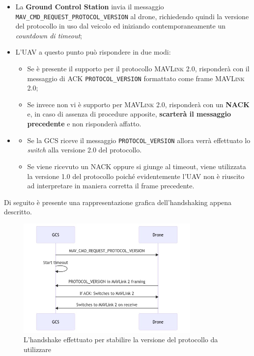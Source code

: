 \documentclass[a4paper, 12pt, oneside]{article}
\theoremstyle{definition}
\begin{document}
\begin{itemize}
    \item La \textbf{Ground Control Station} invia il messaggio \texttt{MAV\_CMD\_REQUEST\_PROTOCOL\_VERSION} al drone, richiedendo quindi la versione del protocollo in uso dal veicolo ed iniziando contemporaneamente un \textit{countdown di timeout};
    \item L'UAV a questo punto può rispondere in due modi: \begin{itemize}
        \item Se è presente il supporto per il protocollo \textsc{MAVLink} 2.0, risponderà con il messaggio di ACK \texttt{PROTOCOL\_VERSION} formattato come frame \textsc{MAVLink} 2.0;
        \item Se invece non vi è supporto per \textsc{MAVLink} 2.0, risponderà con un \textbf{NACK} e, in caso di assenza di procedure apposite, \textbf{scarterà il messaggio precedente} e non risponderà affatto.
    \end{itemize}
    \item \begin{itemize}
        \item Se la GCS riceve il messaggio \texttt{PROTOCOL\_VERSION} allora verrà effettuato lo \textit{switch} alla versione 2.0 del protocollo.
        \item Se viene ricevuto un NACK oppure si giunge al timeout, viene utilizzata la versione 1.0 del protocollo poiché evidentemente l'UAV non è riuscito ad interpretare in maniera corretta il frame precedente.
        \end{itemize} 
\end{itemize}

\newpage

Di seguito è presente una rappresentazione grafica dell'handshaking appena descritto.

\begin{figure}[H]
    \centering
    \includegraphics[width=0.8\textwidth]{images/handshake_mavlink.jpeg}
    \caption{L'handshake effettuato per stabilire la versione del protocollo da utilizzare}
\end{figure}
\end{document}
